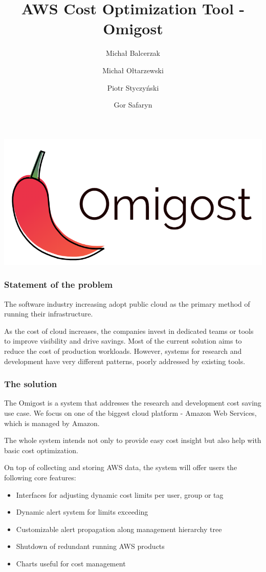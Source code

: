 \documentclass[licencjacka,en]{thesisclass}
\author{
  Michał Balcerzak
  \and
  Michał Ołtarzewski
  \and
  Piotr Styczyński
  \and
  Gor Safaryn
}
\title{AWS Cost Optimization Tool - Omigost}
\begin{document}
\includegraphics[width=\textwidth*\real{0.6}]{imgs/logo.png}

\subsubsection{Statement of the problem}

The software industry increasing adopt public cloud as the primary method of running their infrastructure.

As the cost of cloud increases, the companies invest in dedicated teams or tools to improve visibility and drive savings. Most of the current solution aims to reduce the cost of production workloads. However, systems for research and development have very different patterns, poorly addressed by existing tools. 

\subsubsection{The solution}

The Omigost is a system that addresses the research and development cost saving use case. We focus on one of the biggest cloud platform - Amazon Web Services, which is managed by Amazon.

The whole system intends not only to provide easy cost insight but also help with basic cost optimization.

On top of collecting and storing AWS data, the system will offer users the following core features:

\begin{itemize}
  \item Interfaces for adjusting dynamic cost limits per user, group or tag
  \item Dynamic alert system for limits exceeding
  \item Customizable alert propagation along management hierarchy tree
  \item Shutdown of redundant running AWS products
  \item Charts useful for cost management
\end{itemize}
\end{document}
